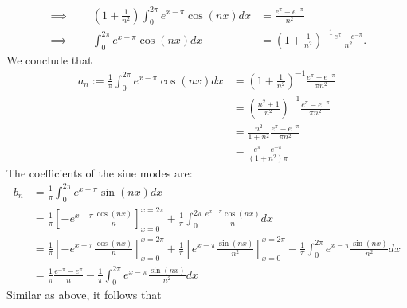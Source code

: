 \documentclass[11pt]{article}
\begin{document}
\begin{solution}
\begin{itemize}
\begin{align*}
            \\
            \implies\qquad 
            \left( 1 + \frac 1 {n^2} \right)
            \int_{0}^{2\pi} e^{x-\pi} \cos(n x) dx
            &=
            \frac{e^{\pi} - e^{-\pi}}{ n^2}
            \\
            \implies\qquad 
            \int_{0}^{2\pi} e^{x-\pi} \cos(n x) dx
            &=
            \left( 1 + \frac 1 {n^2} \right)^{-1}
            \frac{e^{\pi} - e^{-\pi}}{ n^2}
            .   
        \end{align*}
        We conclude that 
        \begin{align*}
            a_n := 
            \frac{1}{\pi}
            \int_{0}^{2\pi} e^{x - \pi} \cos( n x) dx 
            &= 
            \left( 1 + \frac 1 {n^2} \right)^{-1}
            \frac{e^{\pi} - e^{-\pi}}{\pi n^2}
            \\&= 
            \left( \frac {n^2+ 1} {n^2} \right)^{-1}
            \frac{e^{\pi} - e^{-\pi}}{\pi n^2}
            \\&= 
            \frac{n^2}{1+n^2}
            \frac{e^{\pi} - e^{-\pi}}{\pi n^2}
            \\&= 
            \frac{e^{\pi} - e^{-\pi}}{(1+n^2)\pi}
        \end{align*}
        The coefficients of the sine modes are:
        \begin{align*}
            b_n 
            &
            = 
            \frac{1}{\pi}
            \int_{0}^{2\pi} e^{x - \pi} \sin(n x) dx
            \\&
            =
            \frac{1}{\pi}
            \left[- e^{x - \pi} \frac{ \cos( n x) }{ n } \right]_{x=0}^{x=2\pi}
            +
            \frac{1}{\pi}
            \int_{0}^{2\pi} \frac{ e^{x - \pi} \cos( n x) }{ n } dx
            \\&
            =
            \frac{1}{\pi}
             \left[- e^{x - \pi} \frac{ \cos( n x) }{ n } \right]_{x=0}^{x=2\pi}
            +
            \frac{1}{\pi}
            \left[ e^{x-\pi} \frac{ \sin(n x) }{ n^2 } \right]_{x=0}^{x=2\pi}
            -
            \frac{1}{\pi}
            \int_{0}^{2\pi} e^{x-\pi}\frac{ \sin(n x) }{n^2 } dx
            \\&
            =
            \frac{1}{\pi}\frac{e^{-\pi} - e^{\pi}}{n}
            -
            \frac{1}{\pi}
            \int_{0}^{2\pi} e^{x-\pi}\frac{ \sin(n x) }{n^2 } dx
        \end{align*}
        Similar as above, it follows that 
        \begin{align*}

\end{align*}
\end{itemize}
\end{solution}
\end{document}
